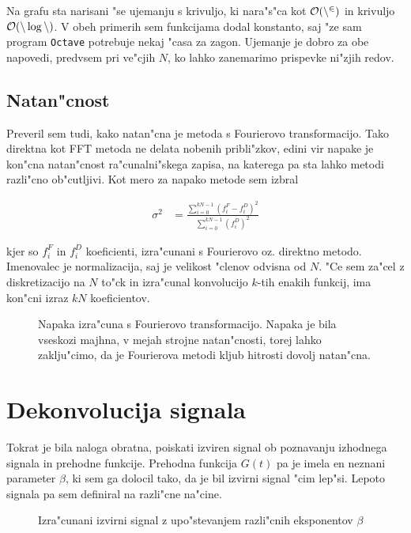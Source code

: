 \documentclass[a4paper,10pt]{article}
\begin{document}
Na grafu sta narisani "se ujemanju s krivuljo, ki nara"s"ca kot $\cal O(n^2)$ in krivuljo $\cal O(n\log n)$. V obeh primerih sem funkcijama dodal konstanto, saj "ze sam program \texttt{Octave} potrebuje nekaj "casa za zagon. Ujemanje je dobro za obe napovedi, predvsem pri ve"cjih $N$, ko lahko zanemarimo prispevke ni"zjih redov. 

\subsection{Natan"cnost}

Preveril sem tudi, kako natan"cna je metoda s Fourierovo transformacijo. Tako direktna kot FFT metoda ne delata nobenih pribli"zkov, edini vir napake je kon"cna natan"cnost ra"cunalni"skega zapisa, na katerega pa sta lahko metodi razli"cno ob"cutljivi. Kot mero za napako metode sem izbral

\begin{align}
 \sigma^2 &= \frac{\sum_{i=0}^{kN-1} \left(f_i^F-f_i^D\right)^2}{\sum_{i=0}^{kN-1} \left(f_i^D\right)^2 }
\end{align}

kjer so $f_i^F$ in $f_i^D$ koeficienti, izra"cunani s Fourierovo oz. direktno metodo. Imenovalec je normalizacija, saj je velikost "clenov odvisna od $N$. "Ce sem za"cel z diskretizacijo na $N$ to"ck in izra"cunal konvolucijo $k$-tih enakih funkcij, ima kon"cni izraz $kN$ koeficientov. 

\begin{figure}[h]
 \centering

\caption{Napaka izra"cuna s Fourierovo transformacijo. Napaka je bila vseskozi majhna, v mejah strojne natan"cnosti, torej lahko zaklju"cimo, da je Fourierova metodi kljub hitrosti dovolj natan"cna. }
\end{figure}



\newpage
\section{Dekonvolucija signala}

Tokrat je bila naloga obratna, poiskati izviren signal ob poznavanju izhodnega signala in prehodne funkcije. Prehodna funkcija $G(t)$ pa je imela en neznani parameter $\beta$, ki sem ga dolocil tako, da je bil izvirni signal "cim lep"si. Lepoto signala pa sem definiral na razli"cne na"cine. 

\begin{figure}[h]
 
 \caption{Izra"cunani izvirni signal z upo"stevanjem razli"cnih eksponentov $\beta$}
\label{fig:decon-3d}
\end{figure}
\end{document}
